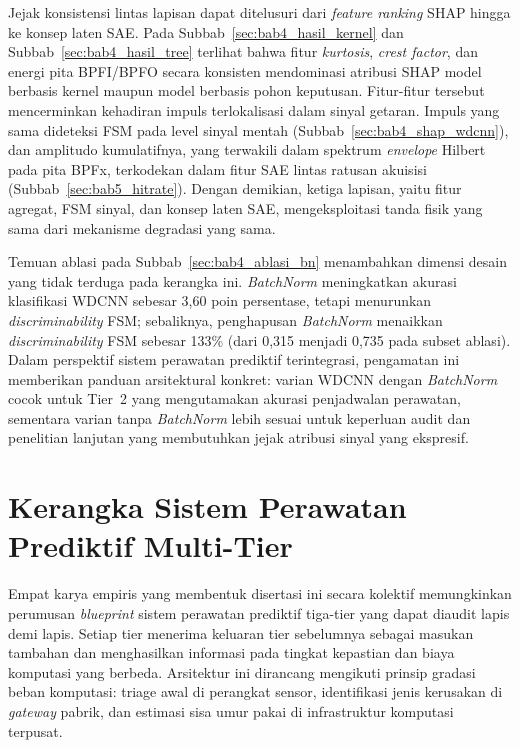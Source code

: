 Jejak konsistensi lintas lapisan dapat ditelusuri dari \emph{feature ranking}
SHAP hingga ke konsep laten SAE. Pada Subbab~\ref{sec:bab4_hasil_kernel} dan
Subbab~\ref{sec:bab4_hasil_tree} terlihat bahwa fitur \emph{kurtosis},
\emph{crest factor}, dan energi pita BPFI/BPFO secara konsisten mendominasi
atribusi SHAP model berbasis kernel maupun model berbasis pohon keputusan.
Fitur-fitur tersebut mencerminkan kehadiran impuls terlokalisasi dalam sinyal
getaran. Impuls yang sama dideteksi FSM pada level sinyal mentah
(Subbab~\ref{sec:bab4_shap_wdcnn}), dan amplitudo kumulatifnya, yang terwakili
dalam spektrum \emph{envelope} Hilbert pada pita BPFx, terkodekan dalam fitur
SAE lintas ratusan akuisisi (Subbab~\ref{sec:bab5_hitrate}). Dengan demikian,
ketiga lapisan, yaitu fitur agregat, FSM sinyal, dan konsep laten SAE,
mengeksploitasi tanda fisik yang sama dari mekanisme degradasi yang sama.

Temuan ablasi pada Subbab~\ref{sec:bab4_ablasi_bn} menambahkan dimensi desain
yang tidak terduga pada kerangka ini. \emph{BatchNorm} meningkatkan akurasi
klasifikasi WDCNN sebesar 3,60 poin persentase, tetapi {\color{blue}menurunkan
\emph{discriminability} FSM; sebaliknya, penghapusan \emph{BatchNorm} menaikkan
\emph{discriminability} FSM sebesar 133\% (dari 0,315 menjadi 0,735 pada subset
ablasi)}. Dalam perspektif sistem perawatan
prediktif terintegrasi, pengamatan ini memberikan panduan arsitektural konkret:
varian WDCNN dengan \emph{BatchNorm} cocok untuk Tier~2 yang mengutamakan
akurasi penjadwalan perawatan, sementara varian tanpa \emph{BatchNorm} lebih
sesuai untuk keperluan audit dan penelitian lanjutan yang membutuhkan jejak
atribusi sinyal yang ekspresif.

\section{Kerangka Sistem Perawatan Prediktif Multi-Tier}
\label{sec:bab6_pdm_multitier}

Empat karya empiris yang membentuk disertasi ini secara kolektif memungkinkan
perumusan \emph{blueprint} sistem perawatan prediktif tiga-tier yang dapat
diaudit lapis demi lapis. Setiap tier menerima keluaran tier sebelumnya sebagai
masukan tambahan dan menghasilkan informasi pada tingkat kepastian dan biaya
komputasi yang berbeda. Arsitektur ini dirancang mengikuti prinsip gradasi beban
komputasi: triage awal di perangkat sensor, identifikasi jenis kerusakan di
\emph{gateway} pabrik, dan estimasi sisa umur pakai di infrastruktur komputasi
terpusat.

